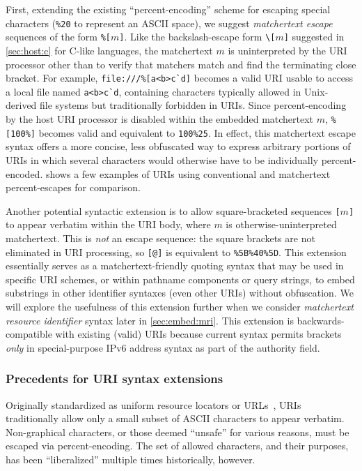 First, extending the existing ``percent-encoding'' scheme
for escaping special characters
(\eg \verb|%20| to represent an ASCII space),
we suggest \emph{matchertext escape} sequences
of the form \verb|%[|$m$\verb|]|.
Like the backslash-escape form \verb|\[|$m$\verb|]|
suggested in \cref{sec:host:c} for C-like languages,
the matchertext $m$ is uninterpreted by the URI processor
other than to verify that matchers match
and find the terminating close bracket.
For example, \verb|file:///%[a<b>c`d]| becomes
a valid URI usable to access a local file named \verb|a<b>c`d|,
containing characters typically allowed in Unix-derived file systems
but traditionally forbidden in URIs.
Since percent-encoding by the host URI processor
is disabled within the embedded matchertext $m$,
\verb|%[100%]| becomes valid and equivalent to \verb|100%25|.
In effect, this matchertext escape syntax offers
a more concise, less obfuscated way to express arbitrary portions of URIs
in which several characters
would otherwise have to be individually percent-encoded.
 shows a few examples of URIs
using conventional and matchertext percent-escapes for comparison.

Another potential syntactic extension is to allow
square-bracketed sequences \verb|[|$m$\verb|]|
to appear verbatim within the URI body,
where $m$ is otherwise-uninterpreted matchertext.
This is \emph{not} an escape sequence:
the square brackets are not eliminated in URI processing,
so \verb|[@]| is equivalent to \verb|%5B%40%5D|.
This extension essentially serves as a matchertext-friendly quoting syntax
that may be used in specific URI schemes,
or within pathname components or query strings,
to embed substrings in other identifier syntaxes (even other URIs)
without obfuscation.
We will explore the usefulness of this extension further
when we consider \emph{matchertext resource identifier} syntax
later in \cref{sec:embed:mri}.
This extension is backwards-compatible with existing (valid) URIs
because current syntax permits brackets \emph{only}
in special-purpose IPv6 address syntax as part of the authority field.




\subsubsection{Precedents for URI syntax extensions}

Originally standardized as uniform resource locators or URLs~\cite{rfc1738},
URIs traditionally allow only a small subset of ASCII characters
to appear verbatim.
Non-graphical characters,
or those deemed ``unsafe'' for various reasons,
must be escaped via percent-encoding.
The set of allowed characters, and their purposes,
has been ``liberalized'' multiple times historically, however.

